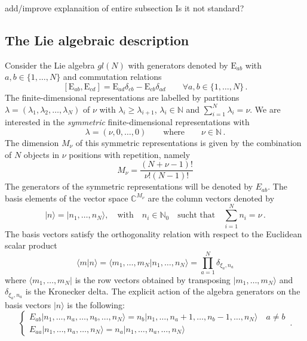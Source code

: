 \documentclass[10pt]{article}
\numberwithin{equation}{section}
\numberwithin{equation}{subsection}
\newcommand{\EE}{\mathrm{E}}
\newcommand{\twoj}{\nu}
\begin{document}
{\color{red}add/improve explanaition of entire subsection} {\color{blue}Is it not standard?}
\subsection{The Lie algebraic description}


Consider the Lie algebra $gl(N)$ with generators denoted by $\EE_{ab}$ with $a,b\in \{1,\ldots,N\}$ and commutation relations
\begin{equation}\label{eq:comgl}
\left[\EE_{ab},\EE_{cd}\right]=\EE_{ad}\delta_{cb}-\EE_{cb}\delta_{ad}\qquad \forall a,b\in \{1,\ldots,N\}\,.
\end{equation}
The finite-dimensional representations are labelled by partitions $\lambda=(\lambda_1,\lambda_2,\ldots,\lambda_N)$ of $\nu$ with  $\lambda_i\geq \lambda_{i+1}$,  $\lambda_i\in \mathbb{N}$ and $\sum_{i=1}^N \lambda_i = \nu$.  
We are interested in the {\em symmetric} finite-dimensional representations with 
\begin{equation}\label{eq:dynkin}
    \lambda=(\twoj,0,\ldots,0) \qquad\text{where}\qquad \twoj\in\mathbb{N}\,.
\end{equation} 
The dimension $M_\twoj$ of this symmetric representations is given by the combination of $N$ objects in $\twoj$ positions with repetition, namely
\begin{equation}
	M_\twoj= \frac{(N+\twoj-1)!}{\twoj  !(N-1)!}
\end{equation} 
The generators of the symmetric representations will be denoted by $E_{ab}$.
The basis elements of the vector space $\mathbb{C}^{M_\twoj}$ are the column vectors denoted by
\begin{equation}
  |n\rangle=  |n_{1},\ldots,n_{N}\rangle,\quad \text{with}\quad n_{i}\in\mathbb{N}_{0}\quad \text{sucht that}\quad \sum_{i=1}^{N}n_{i}=\nu\,.
\end{equation}
The basis vectors satisfy the orthogonality relation with respect to the Euclidean scalar product 
\begin{equation}\label{ortho}
   \langle m|n \rangle =\langle m_{1},\ldots,m_{N}|n_{1},\ldots,n_{N}\rangle=\prod_{a=1}^{N}\delta_{\xi_{a},n_{a}}
\end{equation}
where  $ \langle m_{1},\ldots,m_{N}|$ is the row vectors obtained by transposing $|m_{1},\ldots,m_{N}\rangle$ and $\delta_{\xi_{a},n_{a}}$ is the Kronecker delta. 
The explicit action of the algebra generators on the basis  vectors $|n\rangle$ is the following:
\begin{equation}\label{actionE}
	\begin{cases}
		E_{ab}|n_{1},\ldots,n_{a},\ldots,n_{b},\ldots,n_{N}\rangle =n_{b}|n_{1},\ldots,n_{a}+1,\ldots,n_{b}-1,\ldots,n_{N}\rangle\quad a\neq b\\[0.1cm]
		E_{aa}|n_{1},\ldots,n_{a},\ldots,n_{N}\rangle = n_{a} |n_{1},\ldots,n_{a},\ldots,n_{N}\rangle
	\end{cases}\,.
\end{equation}  
\end{document}
